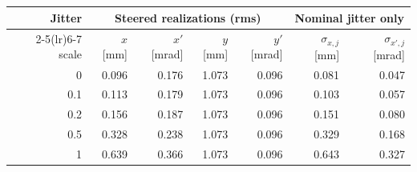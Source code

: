 \begin{tabular}{rrrrrrr}\toprule
Jitter & \multicolumn{4}{c}{Steered realizations (rms)} & \multicolumn{2}{c}{Nominal jitter only}\\
\cmidrule(lr){2-5}\cmidrule(lr){6-7}
scale & $x$ [mm] & $x'$ [mrad] & $y$ [mm] & $y'$ [mrad] & $\sigma_{x,j}$ [mm] & $\sigma_{x',j}$ [mrad]\\\midrule
0 & 0.096 & 0.176 & 1.073 & 0.096 & 0.081 & 0.047\\
0.1 & 0.113 & 0.179 & 1.073 & 0.096 & 0.103 & 0.057\\
0.2 & 0.156 & 0.187 & 1.073 & 0.096 & 0.151 & 0.080\\
0.5 & 0.328 & 0.238 & 1.073 & 0.096 & 0.329 & 0.168\\
1 & 0.639 & 0.366 & 1.073 & 0.096 & 0.643 & 0.327\\
\bottomrule\end{tabular}
